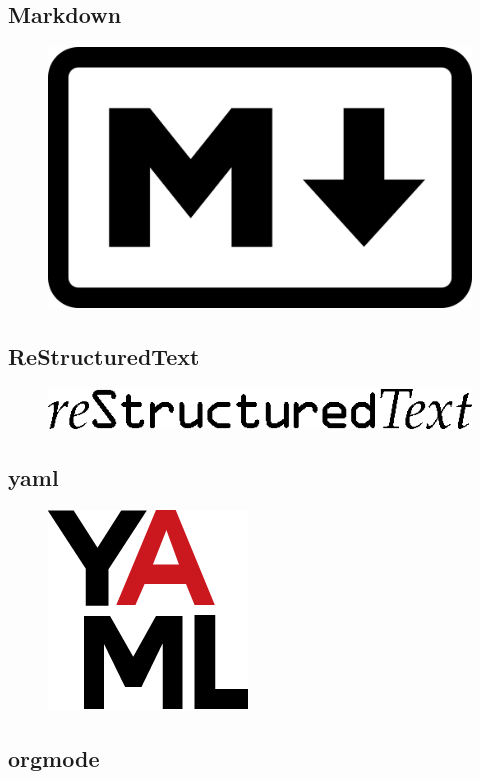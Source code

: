 \subsection{Markdown}
\lipsum[1]
\begin{figure}
	\includegraphics[width=0.19\paperwidth]{./img/markup/markdown}
\end{figure}
\lipsum[1]

\subsection{ReStructuredText}
\lipsum[1]
\begin{figure}
	\includegraphics[width=0.19\paperwidth]{./img/markup/ReStructuredText}
\end{figure}
\lipsum[1]

\subsection{yaml}
\lipsum[1]
\begin{figure}
	\includegraphics[width=0.19\paperwidth]{./img/markup/yaml}
\end{figure}
\lipsum[1]

\subsection{orgmode}
\lipsum[1]
\begin{figure}
	
\end{figure}
\lipsum[1]